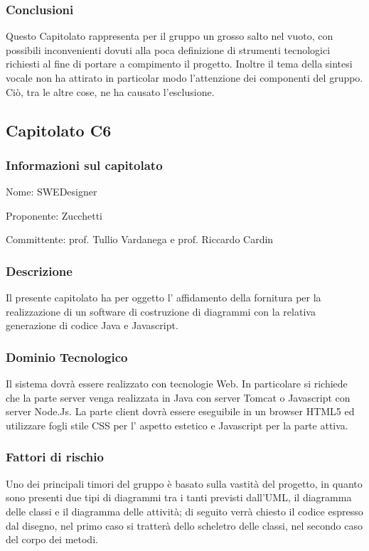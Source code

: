 \subsubsection{Conclusioni}
Questo Capitolato rappresenta per il gruppo un grosso salto nel vuoto, con possibili inconvenienti dovuti alla poca definizione di strumenti tecnologici richiesti al fine di portare a compimento il progetto. Inoltre il tema della sintesi vocale non ha attirato in particolar modo l’attenzione dei componenti del gruppo. Ciò, tra le altre cose, ne ha causato l’esclusione.

\subsection{Capitolato C6}

\subsubsection{Informazioni sul capitolato}
\begin{trivlist}
	\setlength{\itemindent}{+.3in}
	\item  Nome: SWEDesigner
	\item  Proponente: Zucchetti
	\item  Committente: prof. Tullio Vardanega e prof. Riccardo Cardin
\end{trivlist}

\subsubsection{Descrizione}
Il presente capitolato ha per oggetto l’ affidamento della fornitura per la realizzazione di un software di costruzione di diagrammi  con la relativa generazione di codice Java e Javascript.

\subsubsection{Dominio Tecnologico}
Il sistema dovrà essere realizzato con tecnologie Web. In particolare si richiede che la parte server venga realizzata in Java con server Tomcat o Javascript con server Node.Js. La parte client dovrà essere eseguibile in un browser HTML5 ed utilizzare
fogli stile CSS per l’ aspetto estetico e Javascript per la parte attiva.

\subsubsection{Fattori di rischio}
Uno dei principali timori del gruppo è basato sulla vastità del progetto, in quanto sono presenti due tipi di diagrammi tra i tanti previsti dall’UML, il diagramma delle classi e il diagramma delle attività; di seguito verrà chiesto il codice espresso dal disegno, nel primo caso si tratterà dello scheletro delle classi, nel secondo caso del corpo dei metodi. 

